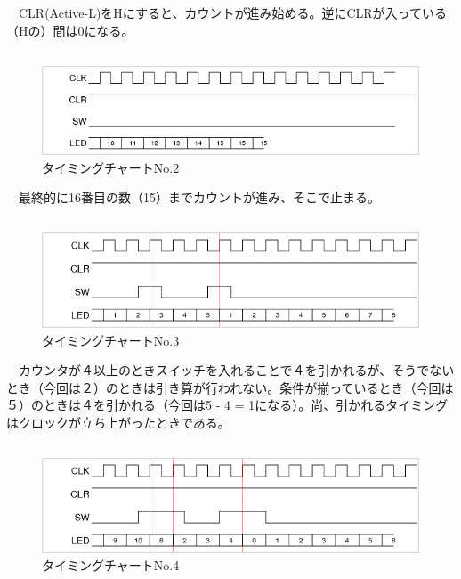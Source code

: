 \documentclass{scrartcl}
\begin{document}
　CLR(Active-L)をHにすると、カウントが進み始める。逆にCLRが入っている（Hの）間は0になる。\\

\subsection{}
\label{sec:org2000d9a}
\begin{figure}[htbp]
\centering
\includegraphics[width=.9\linewidth]{./logic-2.png}
\caption{\label{fig:org9f12d2d}
タイミングチャートNo.2}
\end{figure}


　最終的に16番目の数（15）までカウントが進み、そこで止まる。\\

\subsection{}
\label{sec:org0c836ba}
\begin{figure}[htbp]
\centering
\includegraphics[width=.9\linewidth]{./logic-3.png}
\caption{\label{fig:org707906c}
タイミングチャートNo.3}
\end{figure}

　カウンタが４以上のときスイッチを入れることで４を引かれるが、そうでないとき（今回は２）のときは引き算が行われない。条件が揃っているとき（今回は５）のときは４を引かれる（今回は5 - 4 = 1になる）。尚、引かれるタイミングはクロックが立ち上がったときである。\\

\subsection{}
\label{sec:org695cbbb}
\begin{figure}[htbp]
\centering
\includegraphics[width=.9\linewidth]{./logic-4.png}
\caption{\label{fig:orgc128aba}
タイミングチャートNo.4}
\end{figure}
　\\
\end{document}
